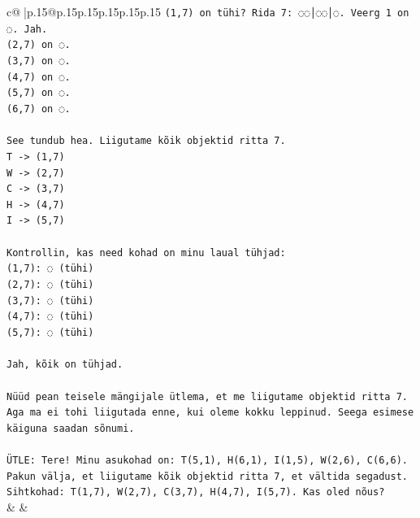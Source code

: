 \documentclass{article}
\begin{document}
{\begin{supertabular}{c@{$\;$}|p{.15\linewidth}@{}p{.15\linewidth}p{.15\linewidth}p{.15\linewidth}p{.15\linewidth}p{.15\linewidth}}
{{{\texttt{(1,7) on tühi? Rida 7: ◌◌│◌◌│◌. Veerg 1 on ◌. Jah.} \\
\texttt{(2,7) on ◌.} \\
\texttt{(3,7) on ◌.} \\
\texttt{(4,7) on ◌.} \\
\texttt{(5,7) on ◌.} \\
\texttt{(6,7) on ◌.} \\
\\ 
\texttt{See tundub hea. Liigutame kõik objektid ritta 7.} \\
\texttt{T {-}> (1,7)} \\
\texttt{W {-}> (2,7)} \\
\texttt{C {-}> (3,7)} \\
\texttt{H {-}> (4,7)} \\
\texttt{I {-}> (5,7)} \\
\\ 
\texttt{Kontrollin, kas need kohad on minu laual tühjad:} \\
\texttt{(1,7): ◌ (tühi)} \\
\texttt{(2,7): ◌ (tühi)} \\
\texttt{(3,7): ◌ (tühi)} \\
\texttt{(4,7): ◌ (tühi)} \\
\texttt{(5,7): ◌ (tühi)} \\
\\ 
\texttt{Jah, kõik on tühjad.} \\
\\ 
\texttt{Nüüd pean teisele mängijale ütlema, et me liigutame objektid ritta 7. Aga ma ei tohi liigutada enne, kui oleme kokku leppinud. Seega esimese käiguna saadan sõnumi.} \\
\\ 
\texttt{ÜTLE: Tere! Minu asukohad on: T(5,1), H(6,1), I(1,5), W(2,6), C(6,6). Pakun välja, et liigutame kõik objektid ritta 7, et vältida segadust. Sihtkohad: T(1,7), W(2,7), C(3,7), H(4,7), I(5,7). Kas oled nõus?} \\
            }
        }
    }
    & & \\ \\


\end{supertabular}}
\end{document}
